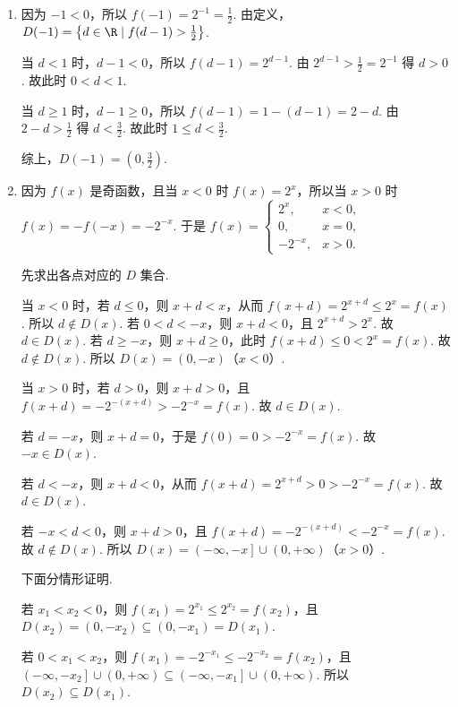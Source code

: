 \begin{solution}
\begin{enumerate}
\item 因为 \(-1<0\)，所以 \(f(-1)=2^{-1}=\frac{1}{2}\). 由定义，\(D(-1)=\left\{ d\in\R \mid f(d-1)>\frac{1}{2} \right\}\).

当 \(d<1\) 时，\(d-1<0\)，所以 \(f(d-1)=2^{d-1}\). 由 \(2^{d-1}>\frac{1}{2}=2^{-1}\) 得 \(d>0\).
故此时 \(0<d<1\).

当 \(d\ge 1\) 时，\(d-1\ge 0\)，所以 \(f(d-1)=1-\left( d-1 \right)=2-d\). 由 \(2-d>\frac{1}{2}\) 得 \(d<\frac{3}{2}\).
故此时 \(1\le d<\frac{3}{2}\).

综上，\(D(-1)=\left( 0,\frac{3}{2} \right)\).

\item 因为 \(f(x)\) 是奇函数，且当 \(x<0\) 时 \(f(x)=2^x\)，所以当 \(x>0\) 时 \(f(x)=-f(-x)=-2^{-x}\). 于是
\(
f(x)=
\begin{cases}
2^x, & x<0,\\
0, & x=0,\\
-2^{-x}, & x>0.
\end{cases}
\)

先求出各点对应的 \(D\) 集合.

当 \(x<0\) 时，若 \(d\le 0\)，则 \(x+d<x\)，从而 \(f(x+d)=2^{x+d}\le 2^x=f(x)\). 所以 \(d\notin D(x)\). 若 \(0<d<-x\)，则 \(x+d<0\)，且 \(2^{x+d}>2^x\). 故 \(d\in D(x)\). 若 \(d\ge -x\)，则 \(x+d\ge 0\)，此时 \(f(x+d)\le 0<2^x=f(x)\). 故 \(d\notin D(x)\). 所以 \(D(x)=\left( 0,-x \right)\)（\(x<0\)）.

当 \(x>0\) 时，若 \(d>0\)，则 \(x+d>0\)，且 \(f(x+d)=-2^{-(x+d)}>-2^{-x}=f(x)\). 故 \(d\in D(x)\).

若 \(d=-x\)，则 \(x+d=0\)，于是 \(f(0)=0>-2^{-x}=f(x)\). 故 \(-x\in D(x)\).

若 \(d<-x\)，则 \(x+d<0\)，从而 \(f(x+d)=2^{x+d}>0>-2^{-x}=f(x)\). 故 \(d\in D(x)\).

若 \(-x<d<0\)，则 \(x+d>0\)，且 \(f(x+d)=-2^{-(x+d)}<-2^{-x}=f(x)\). 故 \(d\notin D(x)\). 所以 \(D(x)=\left( -\infty,-x \right]\cup \left( 0,+\infty \right)\)（\(x>0\)）.

下面分情形证明.

若 \(x_1<x_2<0\)，则 \(f(x_1)=2^{x_1}\le 2^{x_2}=f(x_2)\)，且 \(D(x_2)=\left( 0,-x_2 \right)\subseteq \left( 0,-x_1 \right)=D(x_1)\).

若 \(0<x_1<x_2\)，则 \(f(x_1)=-2^{-x_1}\le -2^{-x_2}=f(x_2)\)，且 \(\left( -\infty,-x_2 \right]\cup \left( 0,+\infty \right)\subseteq \left( -\infty,-x_1 \right]\cup \left( 0,+\infty \right)\). 所以 \(D(x_2)\subseteq D(x_1)\).


\end{enumerate}
\end{solution}
